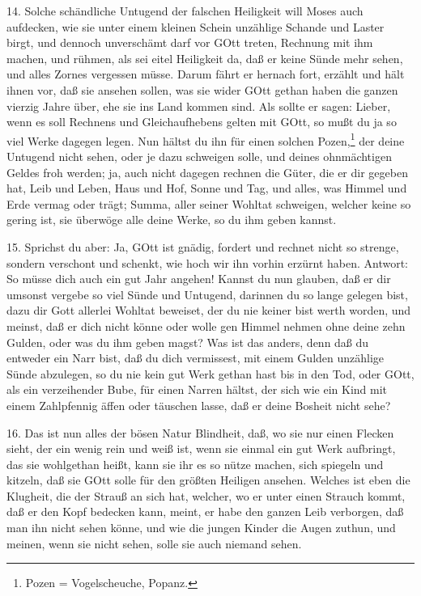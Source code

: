 14. Solche schändliche Untugend der falschen Heiligkeit will Moses auch aufdecken, wie sie unter einem kleinen Schein unzählige Schande und Laster birgt, und dennoch unverschämt darf vor GOtt treten, Rechnung mit ihm machen, und rühmen, als sei eitel Heiligkeit da, daß er keine Sünde mehr sehen, und alles Zornes vergessen müsse. Darum fährt er hernach fort, erzählt und hält ihnen vor, daß sie ansehen sollen, was sie wider GOtt gethan haben die ganzen vierzig Jahre über, ehe sie ins Land kommen sind. Als sollte er sagen: Lieber, wenn es soll Rechnens und Gleichaufhebens gelten mit GOtt, so mußt du ja so viel Werke dagegen legen. Nun hältst du ihn für einen solchen Pozen,\footnote{Pozen = Vogelscheuche, Popanz.} der deine Untugend nicht sehen, oder je dazu schweigen solle, und deines ohnmächtigen Geldes froh werden; ja, auch nicht dagegen rechnen die Güter, die er dir gegeben hat, Leib und Leben, Haus und Hof, Sonne und Tag, und alles, was Himmel und Erde vermag oder trägt; Summa, aller seiner Wohltat schweigen, welcher keine so gering ist, sie überwöge alle deine Werke, so du ihm geben kannst.

15. Sprichst du aber: Ja, GOtt ist gnädig, fordert und rechnet nicht so strenge, sondern verschont und schenkt, wie hoch wir ihn vorhin erzürnt haben. Antwort: So müsse dich auch ein gut Jahr angehen! Kannst du nun glauben, daß er dir umsonst vergebe so viel Sünde und Untugend, darinnen du so lange gelegen bist, dazu dir Gott allerlei Wohltat beweiset, der du nie keiner bist werth worden, und meinst, daß er dich nicht könne oder wolle gen Himmel nehmen ohne deine zehn Gulden, oder was du ihm geben magst? Was ist das anders, denn daß du entweder ein Narr bist, daß du dich vermissest, mit einem Gulden unzählige Sünde abzulegen, so du nie kein gut Werk gethan hast bis in den Tod, oder GOtt, als ein verzeihender Bube, für einen Narren hältst, der sich wie ein Kind mit einem Zahlpfennig äffen oder täuschen lasse, daß er deine Bosheit nicht sehe?

16. Das ist nun alles der bösen Natur Blindheit, daß, wo sie nur einen Flecken sieht, der ein wenig rein und weiß ist, wenn sie einmal ein gut Werk aufbringt, das sie wohlgethan heißt, kann sie ihr es so nütze machen, sich spiegeln und kitzeln, daß sie GOtt solle für den größten Heiligen ansehen. Welches ist eben die Klugheit, die der Strauß an sich hat, welcher, wo er unter einen Strauch kommt, daß er den Kopf bedecken kann, meint, er habe den ganzen Leib verborgen, daß man ihn nicht sehen könne, und wie die jungen Kinder die Augen zuthun, und meinen, wenn sie nicht sehen, solle sie auch niemand sehen.

